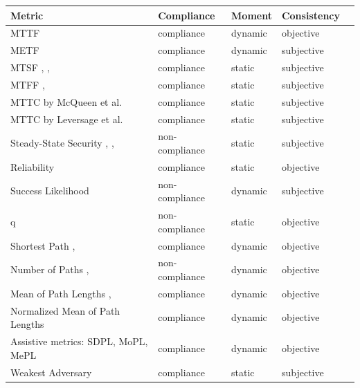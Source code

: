 \begin{tiny}
\begin{longtable}{@{}lllll@{}}
\toprule
\textbf{Metric} & \textbf{Compliance} & \textbf{Moment} & \textbf{Consistency} &  \\ \midrule
\endhead
%
\bottomrule
\endfoot
%
\endlastfoot
%

MTTF \cite{Dacier_Deswarte_Kaaniche_1996a}\cite{Dacier_Deswarte_Kaaniche} & compliance & dynamic & objective &  \\
METF \cite{Ortalo_1999} & compliance & dynamic & subjective &  \\
MTSF \cite{Almasizadeh_Azgomi_2013a}, \cite{Almasizadeh_Azgomi_2009}, \cite{Almasizadeh_2009} & compliance & static & subjective &  \\
MTFF \cite{Al-Kuwaiti_Kyriakopoulos_Hussein_2009}, \cite{Sallhammar_2006} & compliance & static & subjective &  \\
MTTC by McQueen et al. \cite{McQueen_Boyer_Flynn_Beitel_2005} & compliance & static & subjective &  \\
MTTC by Leversage et al. \cite{Leversage_Byres_2008} & compliance & static & subjective &  \\
Steady-State Security \cite{Almasizadeh_Azgomi_2013a}, \cite{Almasizadeh_Azgomi_2009}, \cite{Almasizadeh_2009} & non-compliance & static & subjective &  \\
Reliability \cite{Jha_Sheyner_Wing_2002} & compliance & static & objective &  \\
Success Likelihood \cite{Kanoun_Dubus_Papillon_Cuppens_Boulahia_Cuppens_2012} & non-compliance & dynamic & subjective &  \\
q \cite{Li_Parker_Xu_2011} & non-compliance & static & objective &  \\
Shortest Path \cite{Phillips_Swiler_1998}, \cite{Idika_Bhargava_2012} & compliance & dynamic & objective &  \\
Number of Paths \cite{Ortalo_1999}, \cite{Idika_Bhargava_2012} & non-compliance & dynamic & objective &  \\
Mean of Path Lengths \cite{Li_Vaughn_2006}, \cite{Idika_Bhargava_2012} & compliance & dynamic & objective &  \\
Normalized Mean of Path Lengths\cite{Idika_Bhargava_2012} & compliance & dynamic & objective &  \\
Assistive metrics: SDPL, MoPL, MePL \cite{Idika_Bhargava_2012} & compliance & dynamic & objective &  \\
Weakest Adversary \cite{Pamula_Jajodia_Ammann_Swarup_2006} & compliance & static &  subjective & \\

\end{longtable}
\end{tiny}
